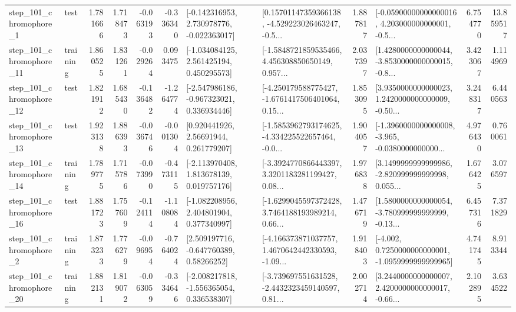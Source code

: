 \begin{tabular}{llrrrrllrlrr}
   step\_101\_chromophore\_1 &      test &      1.781666 &    1.718473 &     -0.063193 & -0.336340 &   [-0.142316953, 2.730978776, -0.022363017] &  [0.15701147359366138, -4.529223026463247, -0.5... &       1.887817 &  [-0.05900000000000016, 4.203000000000001, -0.5... &            6.754770 &         13.859517 \\
  step\_101\_chromophore\_11 &  training &      1.860525 &    1.831261 &     -0.029264 &  0.093475 &    [-1.034084125, 2.561425194, 0.450295573] &  [-1.5848721859535466, 4.456308850650149, 0.957... &       2.037397 &  [1.4280000000000044, -3.8530000000000015, -0.8... &            3.423067 &          1.114969 \\
  step\_101\_chromophore\_12 &      test &      1.821912 &    1.685430 &     -0.136482 & -1.264774 &   [-2.547986186, -0.967323021, 0.336934446] &  [-4.250179588775427, -1.6761417506401064, 0.15... &       1.853095 &  [3.9350000000000023, 1.2420000000000009, -0.50... &            3.248317 &          6.440563 \\
  step\_101\_chromophore\_13 &      test &      1.923138 &    1.886393 &     -0.036746 & -0.001304 &      [0.920441926, 2.56691944, 0.261779207] &  [-1.5853962793174625, -4.334225522657464, -0.0... &       1.904057 &  [-1.3960000000000008, -3.965, -0.0380000000000... &            4.976430 &          0.760061 \\
  step\_101\_chromophore\_14 &  training &      1.789775 &    1.715786 &     -0.073990 & -0.473115 &    [-2.113970408, 1.813678139, 0.019757176] &  [-3.3924770866443397, 3.3201183281199427, 0.08... &       1.976838 &  [3.1499999999999986, -2.820999999999998, 0.055... &            1.676425 &          3.076597 \\
  step\_101\_chromophore\_16 &      test &      1.881723 &    1.757609 &     -0.124114 & -1.108084 &    [-1.082208956, 2.404801904, 0.377340997] &  [-1.6299045597372428, 3.7464188193989214, 0.66... &       1.476719 &  [1.5800000000000054, -3.780999999999999, -0.13... &            6.457316 &          7.371829 \\
   step\_101\_chromophore\_2 &  training &      1.873233 &    1.776279 &     -0.096954 & -0.764024 &     [2.509197716, -0.647760389, 0.58266252] &  [-4.166373871037757, 1.4670642442330593, -1.09... &       1.918403 &  [-4.002, 0.7250000000000001, -1.0959999999999965] &            4.741745 &          8.913344 \\
  step\_101\_chromophore\_20 &  training &      1.882131 &    1.819072 &     -0.063059 & -0.334646 &   [-2.008217818, -1.556365054, 0.336538307] &  [-3.739697551631528, -2.4432323459140597, 0.81... &       2.002714 &  [3.2440000000000007, 2.4200000000000017, -0.66... &            2.102895 &          3.634522 \\

\end{tabular}
